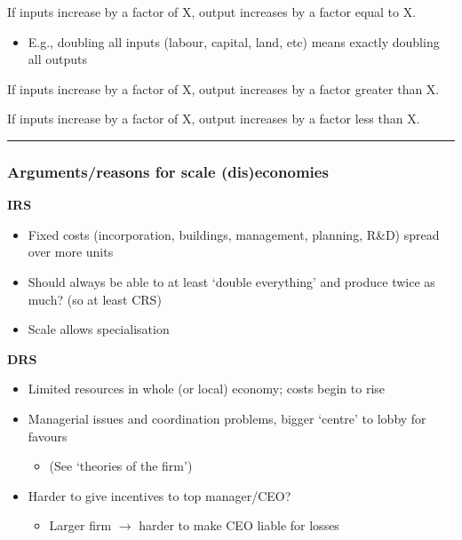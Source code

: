 \documentclass[]{article}
\providecommand{\tightlist}{%
  \setlength{\itemsep}{0pt}\setlength{\parskip}{0pt}}
\begin{document}
\begin{description}
\tightlist
\item[Constant returns to scale (CRS)]
If inputs increase by a factor of X, output increases by a factor equal to X.
\end{description}

\begin{itemize}
\tightlist
\item
  E.g., doubling all inputs (labour, capital, land, etc) means exactly doubling all outputs
\end{itemize}

\bigskip

\begin{description}
\tightlist
\item[Increasing returns to scale (IRS)]
If inputs increase by a factor of X, output increases by a factor greater than X.
\item[Decreasing returns to scale (DRS)]
If inputs increase by a factor of X, output increases by a factor less than X.
\end{description}

\begin{center}\rule{0.5\linewidth}{\linethickness}\end{center}

\hypertarget{argumentsreasons-for-scale-diseconomies}{%
\subsubsection{Arguments/reasons for scale (dis)economies}\label{argumentsreasons-for-scale-diseconomies}}

\textbf{IRS}

\begin{itemize}
\tightlist
\item
  Fixed costs (incorporation, buildings, management, planning, R\&D) spread over more units
\item
  Should always be able to at least `double everything' and produce twice as much? (so at least CRS)
\item
  Scale allows specialisation
\end{itemize}

\textbf{DRS}

\begin{itemize}
\tightlist
\item
  Limited resources in whole (or local) economy; costs begin to rise
\item
  Managerial issues and coordination problems, bigger `centre' to lobby for favours

  \begin{itemize}
  \tightlist
  \item
    (See `theories of the firm')
  \end{itemize}
\item
  Harder to give incentives to top manager/CEO?

  \begin{itemize}
  \tightlist
  \item
    Larger firm \(\rightarrow\) harder to make CEO liable for losses
  \end{itemize}
\end{itemize}
\end{document}
